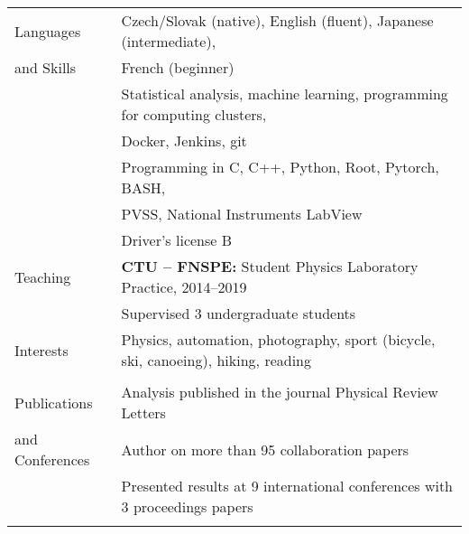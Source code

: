 \documentclass[a4paper,11pt,oneside]{article}
\begin{document}
\newpage

\noindent  \begin{tabular}{@{} l l}
  \Large{Languages}   & Czech/Slovak (native), English (fluent), Japanese (intermediate), \\
\Large{and Skills}    & French (beginner)  \\[.2cm]
     & Statistical analysis, machine learning, programming for computing clusters, \\
     & Docker, Jenkins, git\\[.2cm]
     & Programming in C, C++, Python, Root, Pytorch, BASH,  \\
     & PVSS, National Instruments LabView \\[.2cm]
     & Driver's license B\\[.4cm]
\Large{Teaching} & \textbf{CTU -- FNSPE\@:} Student Physics Laboratory Practice, 2014--2019\\[.1cm]
     & Supervised 3 undergraduate students
     \\[.2cm]
\Large{Interests}    
     & Physics, automation, photography, sport (bicycle, ski, canoeing), hiking, reading \\
     \\[.1cm]
\Large{Publications}   & Analysis published in the journal Physical Review Letters \\
\Large{and Conferences} & Author on more than 95 collaboration papers \\[.2cm]
     & Presented results at 9 international conferences with 3 proceedings papers\\
     & \\[.5cm]
\end{tabular}
\end{document}
